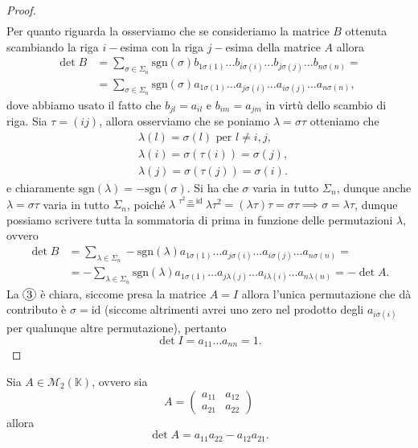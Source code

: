 \begin{proof}
\begin{align}
    \end{align}
    Per quanto riguarda la  osserviamo che se consideriamo la matrice $B$ ottenuta scambiando la riga $i-$esima con la riga $j-$esima della matrice $A$ allora
    \begin{align}
        \det{B} &= \sum_{\sigma \in \Sigma_n} \text{sgn}(\sigma) b_{1\sigma(1)} \ldots b_{i \sigma(i)} \ldots b_{j \sigma(j)} \ldots b_{n \sigma(n)} = \\
        &= \sum_{\sigma \in \Sigma_n} \text{sgn}(\sigma) a_{1 \sigma(1)} \ldots a_{j \sigma(i)} \ldots a_{i \sigma(j)} \ldots a_{n \sigma(n)},
    \end{align} 
    dove abbiamo usato il fatto che $b_{jl} = a_{il}$ e $b_{im} = a_{jm}$ in virtù dello scambio di riga.
    Sia $\tau = (i j)$, allora osserviamo che se poniamo $\lambda = \sigma \tau$ otteniamo che
    \begin{align}
        &\lambda(l) = \sigma(l) \text{ per } l \neq i, j, \\
        &\lambda(i) = \sigma(\tau(i)) = \sigma(j), \\
        &\lambda(j) = \sigma(\tau(j)) = \sigma(i).
    \end{align}
    e chiaramente $\text{sgn}(\lambda) = -\text{sgn}(\sigma)$. Si ha che $\sigma$ varia in tutto $\Sigma_n$, dunque anche $\lambda = \sigma \tau$ varia in tutto $\Sigma_n$, poiché $\lambda \stackrel{\tau^2=\text{id}}{=} \lambda \tau^2 = (\lambda \tau) \tau = \sigma \tau \implies \sigma = \lambda \tau$, dunque possiamo scrivere tutta la sommatoria di prima in funzione delle permutazioni $\lambda$, ovvero
    \begin{align}
    \det{B} &= \sum_{\lambda \in \Sigma_n} -\text{sgn}(\lambda) a_{1 \sigma(1)} \ldots a_{j \sigma(i)} \ldots a_{i \sigma(j)} \ldots a_{n \sigma(n)} = \\
    &= -\sum_{\lambda \in \Sigma_n} \text{sgn}(\lambda) a_{1 \sigma(1)} \ldots a_{j \lambda(j)} \ldots a_{i\lambda(i)} \ldots a_{n \lambda(n)} = -\det{A}.
    \end{align}
    La $\circled{3}$ è chiara, siccome presa la matrice $A = I$ allora l'unica permutazione che dà contributo è $\sigma = \text{id}$ (siccome altrimenti avrei uno zero nel prodotto degli $a_{i\sigma(i)}$ per qualunque altre permutazione), pertanto
    $$
        \det{I} = a_{11} \ldots a_{nn} = 1.
    $$
\end{proof}
\begin{cor}
    Sia $A \in \mathcal{M}_2(\mathbb{K})$, ovvero sia
    $$
        A = \begin{pmatrix}
            a_{11} & a_{12} \\
            a_{21} & a_{22}
        \end{pmatrix}
    $$
    allora
    $$
        \det{A} = a_{11} a_{22} - a_{12} a_{21}.
    $$
\end{cor}
